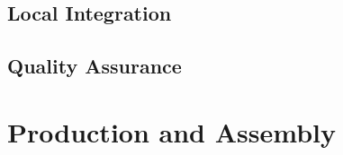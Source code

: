 \subsection{Local Integration}
\label{sec:fddp-slow-cryo-slow-loc-integ}

\subsection{Quality Assurance}
\label{sec:fddp-slow-cryo-slow-qa}


\section{Production and Assembly}
\label{sec:fddp-slow-cryo-prod-assy}


